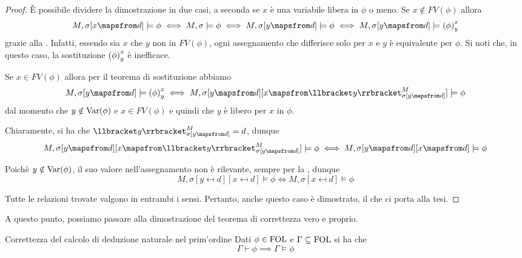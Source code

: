 \begin{proof}
  È possibile dividere la dimostrazione in due casi, a seconda se \(x\) è una variabile libera in \(\phi\) o meno.
  Se \(x \notin FV(\phi)\) allora
  \[M,\sigma[x\mapsfrom d] \models \phi \iff M,\sigma\models \phi \iff M,\sigma[y\mapsfrom d]\models \phi \iff M,\sigma[y\mapsfrom d] \models \subs{\phi}{x}{y}\]
  grazie alla . Infatti, essendo sia \(x\) che \(y\) non in \(FV(\phi)\), ogni assegnamento che differisce solo per \(x\) e \(y\) è equivalente per \(\phi\).
  Si noti che, in questo caso, la sostituzione \({{\left(\phi\right)}^{x}_{y}}\) è inefficace.

  Se \(x \in FV(\phi)\) allora per il teorema di sostituzione abbiamo
  \[M,\sigma[y\mapsfrom d] \models \subs{\phi}{x}{y} \iff M,\sigma[y\mapsfrom d][x\mapsfrom \den{y}[M][\sigma[y\mapsfrom d]]] \models \phi\]
  dal momento che \(y\notin \operatorname{Var}(\phi)\) e \(x \in FV(\phi)\) e quindi che \(y\) è libero per \(x\) in \(\phi\).

  Chiaramente, si ha che \(\den{y}[M][\sigma[y\mapsfrom d]] = d\), dunque
  \[M,\sigma[y\mapsfrom d][x\mapsfrom \den{y}[M][\sigma[y\mapsfrom d]]] \models \phi \iff M,\sigma[y\mapsfrom d][x\mapsfrom d] \models \phi\]

  Poichè \(y\notin \operatorname{Var}(\phi)\), il suo valore nell'assegnamento non è rilevante, sempre per la , dunque
  \[M,\sigma[y\mapsfrom d][x\mapsfrom d] \models \phi \iff M,\sigma[x\mapsfrom d] \models \phi\]

  Tutte le relazioni trovate valgono in entrambi i sensi. Pertanto, anche questo caso è dimostrato, il che ci porta alla tesi.
\end{proof}

A questo punto, possiamo passare alla dimostrazione del teorema di correttezza vero e proprio.

\begin{theorem}{Correttezza del calcolo di deduzione naturale nel prim'ordine}
  Dati \(\phi \in \FOL\) e \(\Gamma \subseteq \FOL\) si ha che
  \[\Gamma \vdash \phi \implies \Gamma \models \phi\]
\end{theorem}

